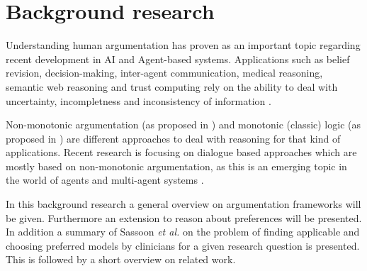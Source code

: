 \section{Background research}

Understanding human argumentation has proven as an important topic regarding recent development in \Gls{AI} and Agent-based systems. Applications such as belief revision, decision-making, inter-agent communication, medical reasoning, semantic web reasoning and trust computing rely on the ability to deal with uncertainty, incompletness and inconsistency of information \cite{liao,Bench2007}.

Non-monotonic argumentation (as proposed in \cite{liao,dung1995}) and monotonic (classic) logic (as proposed in \cite{Reiter1980}) are different approaches to deal with reasoning for that kind of applications. Recent research is focusing on dialogue based approaches which are mostly based on non-monotonic argumentation, as this is an emerging topic in the world of agents and multi-agent systems \cite{parsons2000,Walton1995}.

In this background research a general overview on argumentation frameworks will be given. Furthermore an extension to reason about preferences will be presented. In addition a summary of Sassoon \textit{et al.} \cite{sassoon2014} on the problem of finding applicable and choosing preferred models by clinicians for a given research question is presented. This is followed by a short overview on related work.







